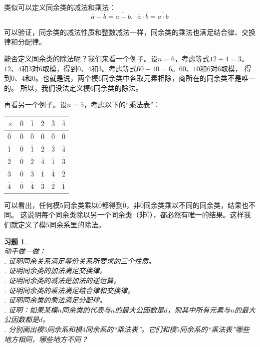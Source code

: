 \documentclass[12pt,UTF8]{ctexbook}
\newtheorem{xt}{习题}[section]
\begin{document}
类似可以定义同余类的减法和乘法：
$$ \overline{a} - \overline{b} = \overline{a - b}, \,\,\, \overline{a} \cdot \overline{b} = \overline{a \cdot b}$$

可以验证，同余类的减法性质和整数减法一样，同余类的乘法也满足结合律、交换律和分配律。

能否定义同余类的除法呢？我们来看一个例子。设$n=6$，考虑等式$12 \div 4 = 3$。
$12$、$4$和$3$对$6$取模，得到$0$、$4$和$3$。考虑等式$60 \div 10 = 6$。$60$、$10$和$6$对$6$取模，
得到$0$、$4$和$0$。也就是说，两个模$6$同余类中各取元素相除，商所在的同余类不是唯一的。
所以，我们没法定义模$6$同余类的除法。

再看另一个例子。设$n=5$，考虑以下的“乘法表”：
\begin{center}
    \begin{tabular}{ | p{2em}<{\centering} | p{2em}<{\centering} | p{2em}<{\centering} | p{2em}<{\centering} | p{2em}<{\centering} | p{2em}<{\centering} | }
        \hline
            $\times$   & $\overline{0}$ & $\overline{1}$ & $\overline{2}$ & $\overline{3}$ & $\overline{4}$ \\ [0.5ex] 
        \hline
        $\overline{0}$ & $\overline{0}$ & $\overline{0}$ & $\overline{0}$ & $\overline{0}$ & $\overline{0}$ \\  
        \hline
        $\overline{1}$ & $\overline{0}$ & $\overline{1}$ & $\overline{2}$ & $\overline{3}$ & $\overline{4}$ \\
        \hline
        $\overline{2}$ & $\overline{0}$ & $\overline{2}$ & $\overline{4}$ & $\overline{1}$ & $\overline{3}$ \\
        \hline
        $\overline{3}$ & $\overline{0}$ & $\overline{3}$ & $\overline{1}$ & $\overline{4}$ & $\overline{2}$ \\
        \hline 
        $\overline{4}$ & $\overline{0}$ & $\overline{4}$ & $\overline{3}$ & $\overline{2}$ & $\overline{1}$ \\
        \hline
    \end{tabular}
\end{center}

可以看出，任何模$5$同余类乘以$\overline{0}$都得到$\overline{0}$，非$\overline{0}$同余类乘以不同的同余类，结果也不同。
这说明每个同余类除以另一个同余类（非$\overline{0}$），都必然有唯一的结果。这样我们就定义了模$5$同余系里的除法。

\begin{xt}\label{xt:3-0-0}
    \mbox{}\\
    动手做一做：\\
    . 证明同余关系满足等价关系所要求的三个性质。 \\
    . 证明同余类的加法满足交换律。 \\
    . 证明同余类的减法是加法的逆运算。\\
    . 证明同余类的乘法满足结合律和交换律。\\
    . 证明同余类的乘法满足分配律。\\
    . 证明：如果某模$n$同余类的代表与$n$的最大公因数是$d$，则其中所有元素与$n$的最大公因数都是$d$。\\
    . 分别画出模$3$同余系和模$4$同余系的“乘法表”。它们和模$5$同余系的“乘法表”哪些地方相同，哪些地方不同？
\end{xt}
\end{document}
